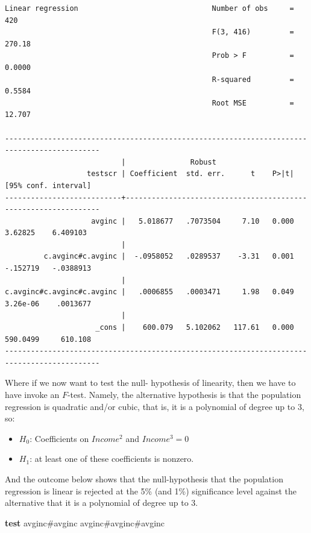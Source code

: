 \documentclass[
]{book}
\newenvironment{Shaded}{\begin{snugshade}}{\end{snugshade}}
\newcommand{\KeywordTok}[1]{\textcolor[rgb]{0.13,0.29,0.53}{\textbf{#1}}}
\newcommand{\NormalTok}[1]{#1}
\providecommand{\tightlist}{%
  \setlength{\itemsep}{0pt}\setlength{\parskip}{0pt}}
\begin{document}
\begin{verbatim}
Linear regression                               Number of obs     =        420
                                                F(3, 416)         =     270.18
                                                Prob > F          =     0.0000
                                                R-squared         =     0.5584
                                                Root MSE          =     12.707

--------------------------------------------------------------------------------------------
                           |               Robust
                   testscr | Coefficient  std. err.      t    P>|t|     [95% conf. interval]
---------------------------+----------------------------------------------------------------
                    avginc |   5.018677   .7073504     7.10   0.000      3.62825    6.409103
                           |
         c.avginc#c.avginc |  -.0958052   .0289537    -3.31   0.001     -.152719   -.0388913
                           |
c.avginc#c.avginc#c.avginc |   .0006855   .0003471     1.98   0.049     3.26e-06    .0013677
                           |
                     _cons |    600.079   5.102062   117.61   0.000     590.0499     610.108
--------------------------------------------------------------------------------------------
\end{verbatim}

Where if we now want to test the null- hypothesis of linearity, then we have to have invoke an \(F\)-test. Namely, the alternative hypothesis is that the population regression is quadratic and/or cubic, that is, it is a polynomial of degree up to 3, so:

\begin{itemize}
\tightlist
\item
  \(H_0\): Coefficients on \(Income^2\) and \(Income^3 = 0\)
\item
  \(H_1\): at least one of these coefficients is nonzero.
\end{itemize}

And the outcome below shows that the null-hypothesis that the population regression is linear is rejected at the 5\% (and 1\%) significance level against the alternative that it is a polynomial of degree up to 3.

\begin{Shaded}
\begin{Highlighting}[]
\KeywordTok{test}\NormalTok{ avginc\#avginc avginc\#avginc\#avginc  }
\end{Highlighting}
\end{Shaded}
\end{document}
